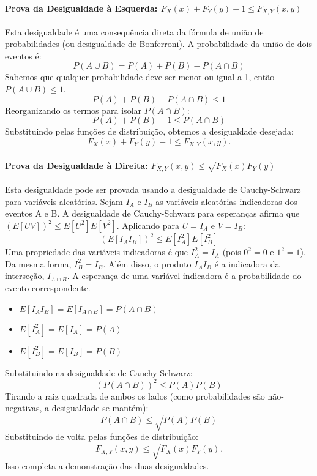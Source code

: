 \documentclass[12pt]{article}
\begin{document}
\paragraph{Prova da Desigualdade à Esquerda: $F_X(x) + F_Y(y) - 1 \le F_{X,Y}(x,y)$}
Esta desigualdade é uma consequência direta da fórmula de união de probabilidades (ou desigualdade de Bonferroni).
A probabilidade da união de dois eventos é:
\[ P(A \cup B) = P(A) + P(B) - P(A \cap B) \]
Sabemos que qualquer probabilidade deve ser menor ou igual a 1, então $P(A \cup B) \le 1$.
\[ P(A) + P(B) - P(A \cap B) \le 1 \]
Reorganizando os termos para isolar $P(A \cap B)$:
\[ P(A) + P(B) - 1 \le P(A \cap B) \]
Substituindo pelas funções de distribuição, obtemos a desigualdade desejada:
\[ F_X(x) + F_Y(y) - 1 \le F_{X,Y}(x,y). \]

\paragraph{Prova da Desigualdade à Direita: $F_{X,Y}(x,y) \le \sqrt{F_X(x)F_Y(y)}$}
Esta desigualdade pode ser provada usando a desigualdade de Cauchy-Schwarz para variáveis aleatórias.
Sejam $I_A$ e $I_B$ as variáveis aleatórias indicadoras dos eventos A e B. A desigualdade de Cauchy-Schwarz para esperanças afirma que $(E[UV])^2 \le E[U^2]E[V^2]$.
Aplicando para $U=I_A$ e $V=I_B$:
\[ (E[I_A I_B])^2 \le E[I_A^2] E[I_B^2] \]
Uma propriedade das variáveis indicadoras é que $I_A^2=I_A$ (pois $0^2=0$ e $1^2=1$). Da mesma forma, $I_B^2=I_B$. Além disso, o produto $I_A I_B$ é a indicadora da interseção, $I_{A \cap B}$. A esperança de uma variável indicadora é a probabilidade do evento correspondente.
\begin{itemize}
    \item $E[I_A I_B] = E[I_{A \cap B}] = P(A \cap B)$
    \item $E[I_A^2] = E[I_A] = P(A)$
    \item $E[I_B^2] = E[I_B] = P(B)$
\end{itemize}
Substituindo na desigualdade de Cauchy-Schwarz:
\[ (P(A \cap B))^2 \le P(A) P(B) \]
Tirando a raiz quadrada de ambos os lados (como probabilidades são não-negativas, a desigualdade se mantém):
\[ P(A \cap B) \le \sqrt{P(A)P(B)} \]
Substituindo de volta pelas funções de distribuição:
\[ F_{X,Y}(x,y) \le \sqrt{F_X(x)F_Y(y)}. \]
Isso completa a demonstração das duas desigualdades. \hfill \qedsymbol
\end{document}
